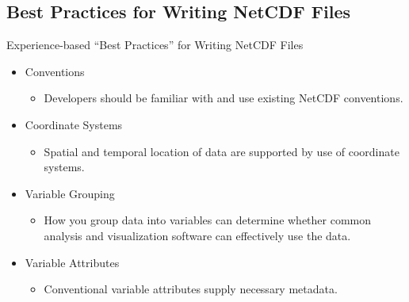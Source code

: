 \documentclass[compress,11pt,xcolor=svgnames,aspectratio=169]{beamer}
\begin{document}
\subsection{Best Practices for Writing NetCDF Files}

\begin{frame}[fragile] {Experience-based ``Best Practices'' for Writing NetCDF Files}

    \begin{itemize}
    \setlength\itemsep{0.4cm}

        \item	Conventions
        \begin{itemize}
          \item Developers should be familiar with and use existing NetCDF conventions.
        \end{itemize}

        \item	Coordinate Systems
        \begin{itemize}
          \item Spatial and temporal location of data are supported by use of coordinate systems.
        \end{itemize}

        \item	Variable Grouping
        \begin{itemize}
          \item How you group data into variables can determine whether common analysis and visualization software can effectively use the data.
        \end{itemize}

        \item	Variable Attributes
        \begin{itemize}
          \item Conventional variable attributes supply necessary metadata.
        \end{itemize}

    \end{itemize}

\nocite{netcdf}

\end{frame}
\end{document}

